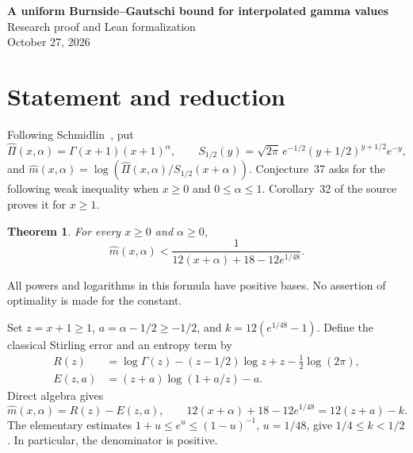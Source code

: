\documentclass[11pt]{article}
\newtheorem{theorem}{Theorem}
\begin{document}
\begin{center}
{\Large\bfseries A uniform Burnside--Gautschi bound for interpolated gamma values}\\[.5em]
Research proof and Lean formalization\\
October 27, 2026
\end{center}
\begin{abstract}
We prove Conjecture~37 of Schmidlin's paper on Stirling--Gautschi inequalities.
The proposed upper bound holds strictly for every nonnegative base point and,
more generally, every nonnegative interpolation parameter. The argument combines
a classical three-term Stirling remainder bound with a logarithmic entropy estimate.
The remaining rational inequality is certified by a quadratic discriminant whose
coefficients become positive after translation. The Lean proof includes the literal
gamma-function expression and a proof of the classical remainder bound.
Independent review and final packet acceptance are pending.
\end{abstract}

\section{Statement and reduction}
Following Schmidlin~\cite{S}, put
\[
 \widehat\Pi(x,\alpha)=\Gamma(x+1)(x+1)^\alpha,
 \qquad S_{1/2}(y)=\sqrt{2\pi}\,e^{-1/2}(y+1/2)^{y+1/2}e^{-y},
\]
and $\widehat m(x,\alpha)=\log(\widehat\Pi(x,\alpha)/S_{1/2}(x+\alpha))$.
Conjecture~37 asks for the following weak inequality when $x\ge0$ and
$0\le\alpha\le1$. Corollary~32 of the source proves it for $x\ge1$.
\begin{theorem}\label{main}
For every $x\ge0$ and $\alpha\ge0$,
\[
 \widehat m(x,\alpha)<
 \frac{1}{12(x+\alpha)+18-12e^{1/48}}.
\]
\end{theorem}
All powers and logarithms in this formula have positive bases. No assertion of
optimality is made for the constant.

Set $z=x+1\ge1$, $a=\alpha-1/2\ge-1/2$, and $k=12(e^{1/48}-1)$.
Define the classical Stirling error and an entropy term by
\begin{align}
 R(z)&=\log\Gamma(z)-(z-1/2)\log z+z-\tfrac12\log(2\pi),\label{R}\\
 E(z,a)&=(z+a)\log(1+a/z)-a.\label{E}
\end{align}
Direct algebra gives
\[
 \widehat m(x,\alpha)=R(z)-E(z,a),\qquad
 12(x+\alpha)+18-12e^{1/48}=12(z+a)-k.
\]
The elementary estimates $1+u\le e^u\le(1-u)^{-1}$, $u=1/48$, give
$1/4\le k<1/2$. In particular, the denominator is positive.
\end{document}
